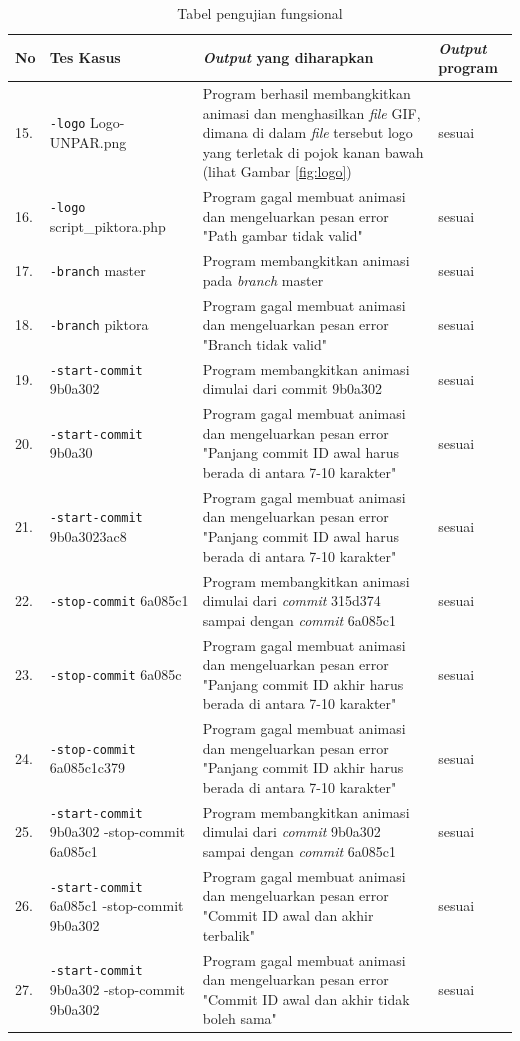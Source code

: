 \begin{table}[htbp]
	\centering
	\caption{Tabel pengujian fungsional}
	
		\begin{tabular}{|p{0.3cm}| p{5 cm}| p{7.3 cm}| p{3 cm}|} \hline
		No & Tes Kasus	& \textit{Output} yang diharapkan & \textit{Output} program \\ \hline
		15. & \texttt{-logo} Logo-UNPAR.png & Program berhasil membangkitkan animasi dan menghasilkan \textit{file} GIF, dimana di dalam \textit{file} tersebut logo yang terletak di pojok kanan bawah (lihat Gambar \ref{fig:logo}) & sesuai  \\ \hline
		16. & \texttt{-logo} script\_piktora.php & Program gagal membuat animasi dan mengeluarkan pesan error "Path gambar tidak valid" & sesuai  \\ \hline
		17. & \texttt{-branch} master & Program membangkitkan animasi pada \textit{branch} master & sesuai  \\ \hline
		18. & \texttt{-branch} piktora  & Program gagal membuat animasi dan mengeluarkan pesan error "Branch tidak valid" & sesuai  \\ \hline
		19. & \texttt{-start-commit} 9b0a302 & Program membangkitkan animasi dimulai dari commit 9b0a302 & sesuai  \\ \hline		
		
		20. & \texttt{-start-commit} 9b0a30 & Program gagal membuat animasi dan mengeluarkan pesan error "Panjang commit ID awal harus berada di antara 7-10 karakter" & sesuai  \\ \hline
		21. & \texttt{-start-commit} 9b0a3023ac8 & Program gagal membuat animasi dan mengeluarkan pesan error "Panjang commit ID awal harus berada di antara 7-10 karakter" & sesuai  \\ \hline
		22. & \texttt{-stop-commit} 6a085c1  & Program membangkitkan animasi dimulai dari \textit{commit} 315d374 sampai dengan \textit{commit} 6a085c1  & sesuai  \\ \hline
		23. & \texttt{-stop-commit} 6a085c & Program gagal membuat animasi dan mengeluarkan pesan error "Panjang commit ID akhir harus berada di antara 7-10 karakter" & sesuai  \\ \hline
		24. & \texttt{-stop-commit} 6a085c1c379 & Program gagal membuat animasi dan mengeluarkan pesan error "Panjang commit ID akhir harus berada di antara 7-10 karakter"  & sesuai  \\ \hline
		25. & \texttt{-start-commit} 9b0a302 -stop-commit 6a085c1 & Program membangkitkan animasi dimulai dari \textit{commit} 9b0a302 sampai dengan \textit{commit} 6a085c1 & sesuai  \\ \hline
		26. & \texttt{-start-commit} 6a085c1 -stop-commit 9b0a302 & Program gagal membuat animasi dan mengeluarkan pesan error "Commit ID awal dan akhir terbalik"  & sesuai\\ \hline
		27. & \texttt{-start-commit} 9b0a302  -stop-commit 9b0a302 & Program gagal membuat animasi dan mengeluarkan pesan error "Commit ID awal dan akhir tidak boleh sama" & sesuai  \\ \hline
\end{tabular}
	\label{table:hasil_pengujian2}
\end{table}
